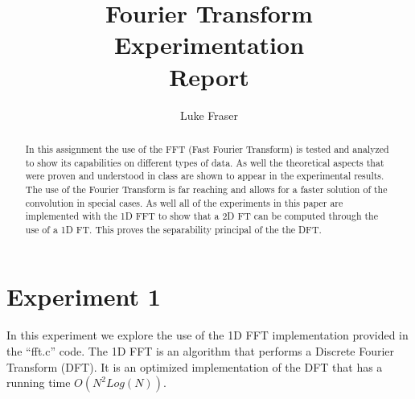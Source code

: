 \documentclass[letter]{article}
\title{Fourier Transform Experimentation \\ Report}
\author{Luke Fraser}
\begin{document}
\maketitle

\begin{abstract}
In this assignment the use of the FFT (Fast Fourier Transform) is tested and analyzed to show its capabilities on different types of data. As well the theoretical aspects that were proven and understood in class are shown to appear in the experimental results. The use of the Fourier Transform is far reaching and allows for a faster solution of the convolution in special cases. As well all of the experiments in this paper are implemented with the 1D FFT to show that a 2D FT can be computed through the use of a 1D FT. This proves the separability principal of the the DFT.
\end{abstract}

\section{Experiment 1}
In this experiment we explore the use of the 1D FFT implementation provided in the ``fft.c'' code. The 1D FFT is an algorithm that performs a Discrete Fourier Transform (DFT). It is an optimized implementation of the DFT that has a running time $O(N^{2}Log(N))$.
\end{document}
